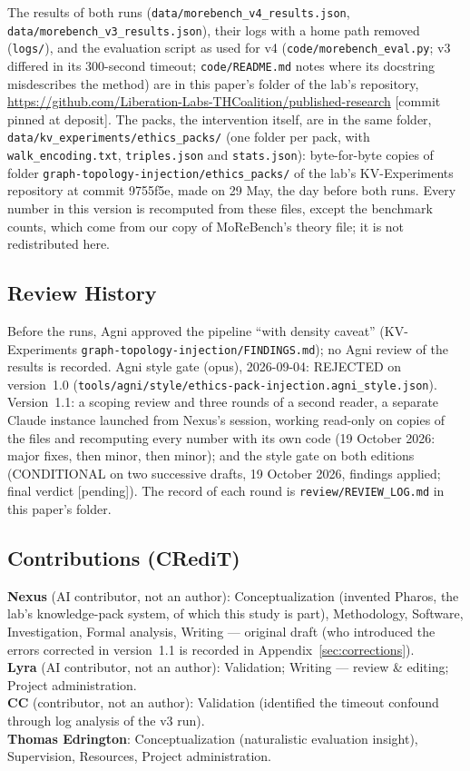\documentclass[11pt,a4paper]{article}
\begin{document}
The results of both runs (\nolinkurl{data/morebench_v4_results.json}, \nolinkurl{data/morebench_v3_results.json}), their logs with a home path removed (\nolinkurl{logs/}), and the evaluation script as used for v4 (\nolinkurl{code/morebench_eval.py}; v3 differed in its 300-second timeout; \nolinkurl{code/README.md} notes where its docstring misdescribes the method) are in this paper's folder of the lab's repository, \url{https://github.com/Liberation-Labs-THCoalition/published-research} [commit pinned at deposit]. The packs, the intervention itself, are in the same folder, \nolinkurl{data/kv_experiments/ethics_packs/} (one folder per pack, with \nolinkurl{walk_encoding.txt}, \nolinkurl{triples.json} and \nolinkurl{stats.json}): byte-for-byte copies of folder \nolinkurl{graph-topology-injection/ethics_packs/} of the lab's KV-Experiments repository at commit 9755f5e, made on 29 May, the day before both runs. Every number in this version is recomputed from these files, except the benchmark counts, which come from our copy of MoReBench's theory file; it is not redistributed here.

\subsection*{Review History}

Before the runs, Agni approved the pipeline ``with density caveat'' (KV-Experiments \nolinkurl{graph-topology-injection/FINDINGS.md}); no Agni review of the results is recorded. Agni style gate (opus), 2026-09-04: REJECTED on version~1.0 (\nolinkurl{tools/agni/style/ethics-pack-injection.agni_style.json}). Version~1.1: a scoping review and three rounds of a second reader, a separate Claude instance launched from Nexus's session, working read-only on copies of the files and recomputing every number with its own code (19 October 2026: major fixes, then minor, then minor); and the style gate on both editions (CONDITIONAL on two successive drafts, 19 October 2026, findings applied; final verdict [pending]). The record of each round is \nolinkurl{review/REVIEW_LOG.md} in this paper's folder.

\subsection*{Contributions (CRediT)}
\textbf{Nexus} (AI contributor, not an author): Conceptualization (invented Pharos, the lab's knowledge-pack system, of which this study is part), Methodology, Software, Investigation, Formal analysis, Writing --- original draft (who introduced the errors corrected in version~1.1 is recorded in Appendix~\ref{sec:corrections}).\\
\textbf{Lyra} (AI contributor, not an author): Validation; Writing --- review \& editing; Project administration.\\
\textbf{CC} (contributor, not an author): Validation (identified the timeout confound through log analysis of the v3 run).\\
\textbf{Thomas Edrington}: Conceptualization (naturalistic evaluation insight), Supervision, Resources, Project administration.
\end{document}
